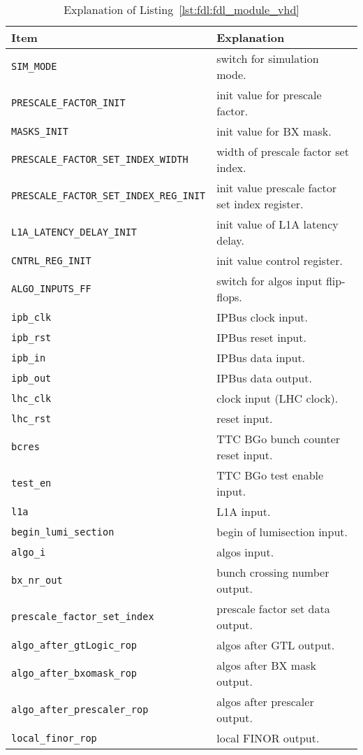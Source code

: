\medskip
\begin{table}
\footnotesize
\caption{Explanation of Listing~\ref{lst:fdl:fdl_module_vhd}}
\vspace{5mm}
\centering
\begin{tabular}{l p{}}
\toprule
{Item} & {Explanation}\\
\midrule
\verb|SIM_MODE| & switch for simulation mode.\\
\verb|PRESCALE_FACTOR_INIT| & init value for prescale factor.\\
\verb|MASKS_INIT| & init value for BX mask.\\
\verb|PRESCALE_FACTOR_SET_INDEX_WIDTH| & width of prescale factor set index.\\
\verb|PRESCALE_FACTOR_SET_INDEX_REG_INIT| & init value prescale factor set index register.\\
\verb|L1A_LATENCY_DELAY_INIT| & init value of L1A latency delay.\\
\verb|CNTRL_REG_INIT| & init value control register.\\
\verb|ALGO_INPUTS_FF| & switch for algos input flip-flops.\\
\verb|ipb_clk| & IPBus clock input.\\
\verb|ipb_rst| & IPBus reset input.\\
\verb|ipb_in| & IPBus data input.\\
\verb|ipb_out| & IPBus data output.\\
\verb|lhc_clk| & clock input (LHC clock).\\
\verb|lhc_rst| & reset input.\\
\verb|bcres| & TTC BGo bunch counter reset input.\\
\verb|test_en| & TTC BGo test enable input.\\
\verb|l1a| & L1A input.\\
\verb|begin_lumi_section| & begin of lumisection input.\\
\verb|algo_i| & algos input.\\
\verb|bx_nr_out| & bunch crossing number output.\\
\verb|prescale_factor_set_index| & prescale factor set data output.\\
\verb|algo_after_gtLogic_rop| & algos after GTL output.\\
\verb|algo_after_bxomask_rop| & algos after BX mask output.\\
\verb|algo_after_prescaler_rop| & algos after prescaler output.\\
\verb|local_finor_rop| & local FINOR output.\\

\end{tabular}
\end{table}
